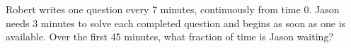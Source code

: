 Robert writes one question every 7 minutes, continuously from time 0. Jason needs 3 minutes to solve each completed question and begins as soon as one is available. Over the first 45 minutes, what fraction of time is Jason waiting?
